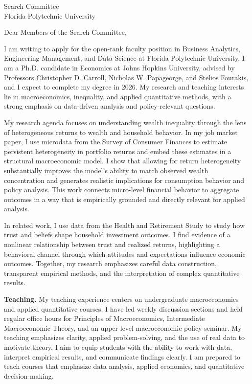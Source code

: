 \documentclass[11pt,letterpaper]{letter}
\begin{document}
\begin{letter}{Search Committee \\
Florida Polytechnic University}

\opening{Dear Members of the Search Committee,}

I am writing to apply for the open-rank faculty position in Business Analytics, Engineering Management, and Data Science at Florida Polytechnic University. I am a Ph.D. candidate in Economics at Johns Hopkins University, advised by Professors Christopher D. Carroll, Nicholas W. Papageorge, and Stelios Fourakis, and I expect to complete my degree in 2026. My research and teaching interests lie in macroeconomics, inequality, and applied quantitative methods, with a strong emphasis on data-driven analysis and policy-relevant questions.

My research agenda focuses on understanding wealth inequality through the lens of heterogeneous returns to wealth and household behavior. In my job market paper, I use microdata from the Survey of Consumer Finances to estimate persistent heterogeneity in portfolio returns and embed these estimates in a structural macroeconomic model. I show that allowing for return heterogeneity substantially improves the model’s ability to match observed wealth concentration and generates realistic implications for consumption behavior and policy analysis. This work connects micro-level financial behavior to aggregate outcomes in a way that is empirically grounded and directly relevant for applied analysis.

In related work, I use data from the Health and Retirement Study to study how trust and beliefs shape household investment outcomes. I find evidence of a nonlinear relationship between trust and realized returns, highlighting a behavioral channel through which attitudes and expectations influence economic outcomes. Together, my research emphasizes careful data construction, transparent empirical methods, and the interpretation of complex quantitative results.

\textbf{Teaching.} My teaching experience centers on undergraduate macroeconomics and applied quantitative courses. I have led weekly discussion sections and held regular office hours for Principles of Macroeconomics, Intermediate Macroeconomic Theory, and an upper-level macroeconomic policy seminar. My teaching emphasizes clarity, applied problem-solving, and the use of real data to motivate theory. I aim to equip students with the ability to work with data, interpret empirical results, and communicate findings clearly. I am prepared to teach courses that emphasize data analysis, applied economics, and quantitative decision-making.


\end{letter}
\end{document}
